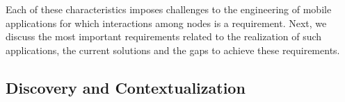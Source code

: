 %
%

Each of these characteristics imposes challenges to the engineering of mobile applications for which interactions among nodes is a requirement. Next, we discuss the most important requirements related to the realization of such applications, the current solutions and the gaps to achieve these requirements.

\subsection{Discovery and Contextualization}


